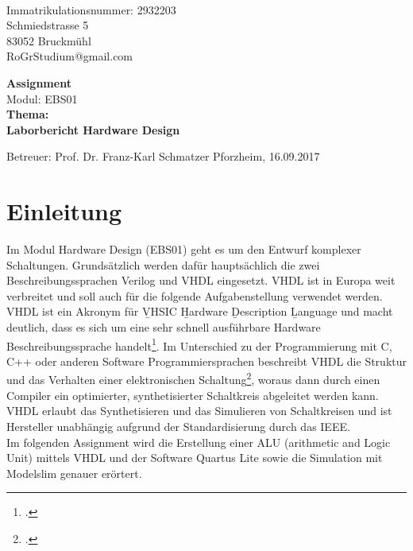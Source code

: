 \documentclass[12pt,a4paper]{scrartcl}	%
\begin{document}
\begin{titlepage}
	\\
	Immatrikulationsnummer:	2932203\\
	Schmiedstrasse 5\\
	83052 Bruckmühl\\
	RoGrStudium@gmail.com\\
	\vspace{5cm}
	
	\begin{center}
		{\Huge \textbf{Assignment} }\\ 
		Modul: EBS01\\
		\vspace{1cm}
		\textbf{Thema:}\\
		\textbf{\large{Laborbericht Hardware Design}}\\
	
	\end{center}
	
	\vspace{6cm}
	Betreuer: Prof. Dr. Franz-Karl Schmatzer
	\vfill Pforzheim, 16.09.2017

\end{titlepage}
\newpage
\tableofcontents
\newpage
\clearpage
\thispagestyle{empty}
\listoffigures
\newpage

\clearpage
\thispagestyle{empty}
\newpage

\setcounter{page}{1}
\section{Einleitung}
Im Modul Hardware Design (EBS01) geht es um den Entwurf komplexer Schaltungen. Grundsätzlich werden dafür hauptsächlich die zwei Beschreibungssprachen Verilog und VHDL eingesetzt. VHDL ist in Europa weit verbreitet und soll auch für die folgende Aufgabenstellung verwendet werden.\\
VHDL ist ein Akronym für \b{V}HSIC \b{H}ardware \b{D}escription \b{L}anguage und macht deutlich, dass es sich um eine sehr schnell ausführbare Hardware Beschreibungssprache handelt\footcite[vgl.][S. 3]{Ein}.
Im Unterschied zu der Programmierung mit C, C++ oder anderen Software Programmiersprachen beschreibt VHDL die Struktur und das Verhalten einer elektronischen Schaltung\footcite[vgl.][S. XV]{VHDL}, woraus dann durch einen Compiler ein optimierter, synthetisierter Schaltkreis abgeleitet werden kann.
VHDL erlaubt das Synthetisieren und das Simulieren von Schaltkreisen und ist Hersteller unabhängig aufgrund der Standardisierung durch das IEEE.\\
Im folgenden Assignment wird die Erstellung einer ALU (arithmetic and Logic Unit) mittels VHDL und der Software Quartus Lite sowie die Simulation mit Modelslim genauer erörtert.
\end{document}

